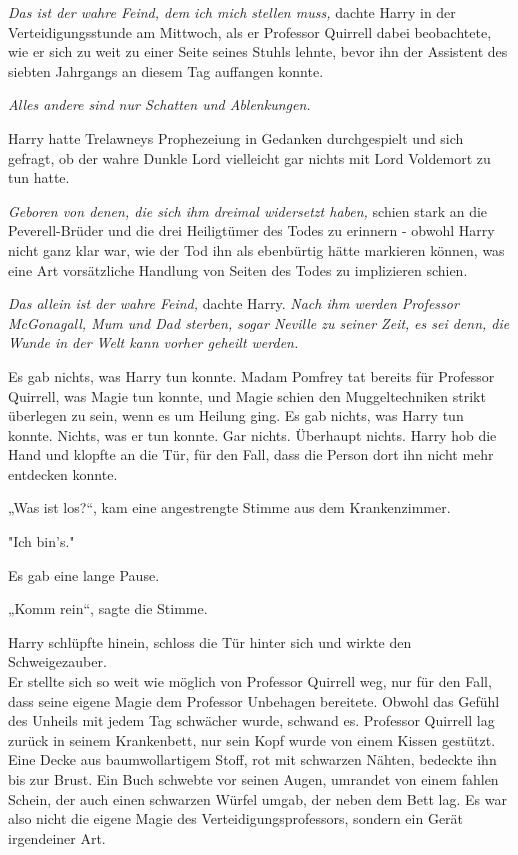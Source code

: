 {\emph{Das ist der wahre Feind, dem ich mich stellen muss,} dachte Harry in der Verteidigungsstunde am Mittwoch, als er Professor Quirrell dabei beobachtete, wie er sich zu weit zu einer Seite seines Stuhls lehnte, bevor ihn der Assistent des siebten Jahrgangs an diesem Tag auffangen konnte.

\emph{Alles andere sind nur Schatten und Ablenkungen.}

Harry hatte Trelawneys Prophezeiung in Gedanken durchgespielt und sich gefragt, ob der wahre Dunkle Lord vielleicht gar nichts mit Lord Voldemort zu tun hatte.

\emph{Geboren von denen, die sich ihm dreimal widersetzt haben,} schien stark an die Peverell-Brüder und die drei Heiligtümer des Todes zu erinnern - obwohl Harry nicht ganz klar war, wie der Tod ihn als ebenbürtig hätte markieren können, was eine Art vorsätzliche Handlung von Seiten des Todes zu implizieren schien.

\emph{Das allein ist der wahre Feind,} dachte Harry. \emph{Nach ihm werden Professor McGonagall, Mum und Dad sterben, sogar Neville zu seiner Zeit,} \emph{es sei denn, die Wunde in der Welt kann vorher geheilt werden.}

Es gab nichts, was Harry tun konnte. Madam Pomfrey tat bereits für Professor Quirrell, was Magie tun konnte, und Magie schien den Muggeltechniken strikt überlegen zu sein, wenn es um Heilung ging. Es gab nichts, was Harry tun konnte. Nichts, was er tun konnte. Gar nichts. Überhaupt nichts. Harry hob die Hand und klopfte an die Tür, für den Fall, dass die Person dort ihn nicht mehr entdecken konnte.

„Was ist los?“, kam eine angestrengte Stimme aus dem Krankenzimmer.

"Ich bin's."

Es gab eine lange Pause.

„Komm rein“, sagte die Stimme.

Harry schlüpfte hinein, schloss die Tür hinter sich und wirkte den Schweigezauber.\\ Er stellte sich so weit wie möglich von Professor Quirrell weg, nur für den Fall, dass seine eigene Magie dem Professor Unbehagen bereitete. Obwohl das Gefühl des Unheils mit jedem Tag schwächer wurde, schwand es. Professor Quirrell lag zurück in seinem Krankenbett, nur sein Kopf wurde von einem Kissen gestützt. Eine Decke aus baumwollartigem Stoff, rot mit schwarzen Nähten, bedeckte ihn bis zur Brust. Ein Buch schwebte vor seinen Augen, umrandet von einem fahlen Schein, der auch einen schwarzen Würfel umgab, der neben dem Bett lag. Es war also nicht die eigene Magie des Verteidigungsprofessors, sondern ein Gerät irgendeiner Art.

}
